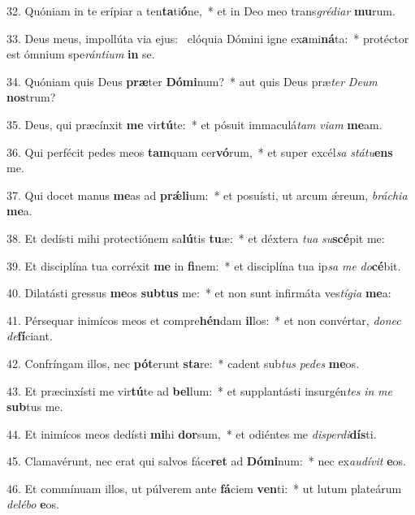 32. Quóniam in te erípiar a ten\textbf{ta}ti\textbf{ó}ne,~*  et in Deo meo trans\textit{gré}\textit{di}\textit{ar} \textbf{mu}rum.\

33. Deus meus, impollúta via ejus: \dag\  elóquia Dómini igne ex\textbf{a}mi\textbf{ná}ta:~*  protéctor est ómnium spe\textit{rán}\textit{ti}\textit{um} \textbf{in} se.\

34. Quóniam quis Deus \textbf{præ}ter \textbf{Dó}\textbf{mi}num?~*  aut quis Deus præ\textit{ter} \textit{De}\textit{um} \textbf{nos}trum?\

35. Deus, qui præcínxit \textbf{me} vir\textbf{tú}te:~*  et pósuit immaculá\textit{tam} \textit{vi}\textit{am} \textbf{me}am.\

36. Qui perfécit pedes meos \textbf{tam}quam cer\textbf{vó}rum,~*  et super excél\textit{sa} \textit{stá}\textit{tu}\textbf{ens} me.\

37. Qui docet manus \textbf{me}as ad \textbf{prǽ}\textbf{li}um:~*  et posuísti, ut arcum ǽreum, \textit{brá}\textit{chi}\textit{a} \textbf{me}a.\

38. Et dedísti mihi protectiónem sa\textbf{lú}tis \textbf{tu}æ:~*  et déxtera \textit{tu}\textit{a} \textit{su}\textbf{scé}pit me:\

39. Et disciplína tua corréxit \textbf{me} in \textbf{fi}nem:~*  et disciplína tua ip\textit{sa} \textit{me} \textit{do}\textbf{cé}bit.\

40. Dilatásti gressus \textbf{me}os \textbf{sub}\textbf{tus} me:~*  et non sunt infirmáta ves\textit{tí}\textit{gi}\textit{a} \textbf{me}a:\

41. Pérsequar inimícos meos et compre\textbf{hén}dam \textbf{il}los:~*  et non convértar, \textit{do}\textit{nec} \textit{de}\textbf{fí}ciant.\

42. Confríngam illos, nec \textbf{pót}erunt \textbf{sta}re:~*  cadent sub\textit{tus} \textit{pe}\textit{des} \textbf{me}os.\

43. Et præcinxísti me vir\textbf{tú}te ad \textbf{bel}lum:~*  et supplantásti insurgén\textit{tes} \textit{in} \textit{me} \textbf{sub}tus me.\

44. Et inimícos meos dedísti \textbf{mi}hi \textbf{dor}sum,~*  et odiéntes me \textit{dis}\textit{per}\textit{di}\textbf{dís}ti.\

45. Clamavérunt, nec erat qui salvos fáce\textbf{ret} ad \textbf{Dó}\textbf{mi}num:~*  nec ex\textit{au}\textit{dí}\textit{vit} \textbf{e}os.\

46. Et commínuam illos, ut púlverem ante \textbf{fá}ciem \textbf{ven}ti:~*  ut lutum plateárum \textit{de}\textit{lé}\textit{bo} \textbf{e}os.\

